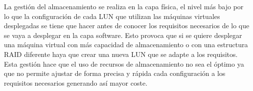 La gestión del almacenamiento se realiza en la capa física, el nivel más bajo por lo que la configuración de cada LUN que utilizan las máquinas virtuales desplegadas se tiene que hacer antes de conocer los requisitos necesarios de lo que se vaya a desplegar en la capa software. Esto provoca que si se quiere desplegar una máquina virtual con más capacidad de almacenamiento o con una estructura RAID diferente haya que crear una nueva LUN que se adapte a los requisitos.
Esta gestión hace que el uso de recursos de almacenamiento no sea el óptimo ya que no permite ajustar de forma precisa y rápida cada configuración a los requisitos necesarios generando así mayor coste.

